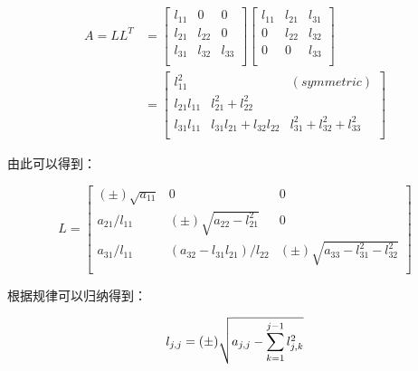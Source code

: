 \begin{equation*}
    \begin{aligned}
        A = LL^T & =
        \begin{bmatrix}
            l_{11} & 0      & 0      \\
            l_{21} & l_{22} & 0      \\
            l_{31} & l_{32} & l_{33} \\
        \end{bmatrix}
        \begin{bmatrix}
            l_{11} & l_{21} & l_{31} \\
            0      & l_{22} & l_{32} \\
            0      & 0      & l_{33} \\
        \end{bmatrix} \\
                 & =
        \begin{bmatrix}
            l_{11}^2     &                             & (symmetric)                     \\
            l_{21}l_{11} & l_{21}^2 + l_{22}^2                                           \\
            l_{31}l_{11} & l_{31}l_{21} + l_{32}l_{22} & l_{31}^2 + l_{32}^2 + l_{33} ^2 \\
        \end{bmatrix}
    \end{aligned}
\end{equation*}

由此可以得到：

\begin{equation*}
    L =
    \begin{bmatrix}
        (\pm) \sqrt{a_{11}} & 0                            & 0                                     \\
        a_{21} / l_{11}     & (\pm)\sqrt{a_{22}-l_{21}^2}  & 0                                     \\
        a_{31} / l_{11}     & (a_{32}-l_{31}l_{21})/l_{22} & (\pm) \sqrt{a_{33}-l_{31}^2-l_{32}^2} \\
    \end{bmatrix}
\end{equation*}

根据规律可以归纳得到：

\begin{equation*}
    l_{j,j} = (\pm) \sqrt{a_{j,j} - \sum_{k=1}^{j-1} l_{j,k}^2} \\
\end{equation*}

